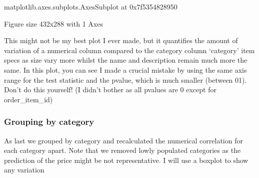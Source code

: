 \documentclass[letterpaper,10pt,english]{jupyterBook}
\begin{document}
\begin{sphinxVerbatim}[commandchars=\\\{\}]
\end{sphinxVerbatim}

\begin{sphinxVerbatim}[commandchars=\\\{\}]
\PYGZlt{}matplotlib.axes.\PYGZus{}subplots.AxesSubplot at 0x7f5354828950\PYGZgt{}
\end{sphinxVerbatim}

\begin{sphinxVerbatim}[commandchars=\\\{\}]
\PYGZlt{}Figure size 432x288 with 1 Axes\PYGZgt{}
\end{sphinxVerbatim}

\sphinxAtStartPar
This might not be my best plot I ever made, but it quantifies the amount of variation of a numerical column compared to the category column ‘category’ item specs as size vary more whilst the name and description remain much more the same. In this plot, you can see I made a crucial mistake by using the same axis range for the test statistic and the p\sphinxhyphen{}value, which is much smaller (between 0\sphinxhyphen{}1). Don’t do this yourself! (I didn’t bother as all p\sphinxhyphen{}values are 0 except for order\_item\_id)


\subsubsection{Grouping by category}
\label{\detokenize{c7_case_studies/Olist:id7}}
\sphinxAtStartPar
As last we grouped by category and recalculated the numerical correlation for each category apart. Note that we removed lowly populated categories as the prediction of the price might be not representative. I will use a boxplot to show any variation

\begin{sphinxVerbatim}[commandchars=\\\{\}]
  
\end{sphinxVerbatim}
\end{document}
